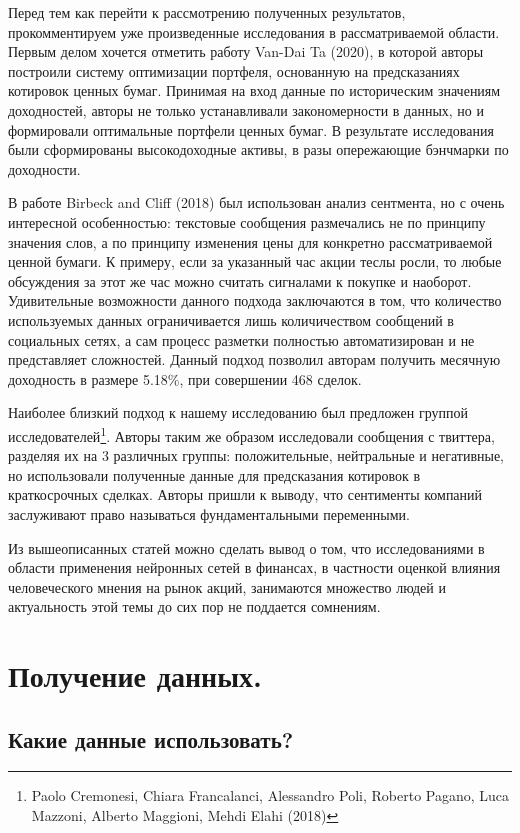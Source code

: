 \documentclass{article}
\begin{document}
Перед тем как перейти к рассмотрению полученных результатов, прокомментируем уже произведенные исследования в рассматриваемой области. Первым делом хочется отметить работу Van-Dai Ta (2020), в которой авторы построили систему оптимизации портфеля, основанную на предсказаниях котировок ценных бумаг. Принимая на вход данные по историческим значениям доходностей, авторы не только устанавливали закономерности в данных,  но и формировали оптимальные портфели ценных бумаг. В результате исследования были сформированы высокодоходные активы, в разы опережающие бэнчмарки по доходности. 
\par В работе Birbeck and Cliff (2018) был использован анализ сентмента, но с очень интересной особенностью: текстовые сообщения размечались не по принципу значения слов, а по принципу изменения цены для конкретно рассматриваемой ценной бумаги. К примеру, если за указанный час акции теслы росли, то любые обсуждения за этот же час можно считать сигналами к покупке и наоборот. Удивительные возможности данного подхода заключаются в том, что количество используемых данных ограничивается лишь количичеством сообщений в социальных сетях, а сам процесс разметки полностью автоматизирован и  не представляет сложностей. Данный подход позволил авторам получить месячную доходность в размере 5.18\%, при совершении 468 сделок.
\par Наиболее близкий подход к нашему исследованию был предложен группой исследователей\footnote{Paolo Cremonesi, Chiara Francalanci, Alessandro Poli, Roberto Pagano, Luca Mazzoni, Alberto Maggioni, Mehdi Elahi (2018)}. Авторы таким же образом исследовали сообщения с твиттера, разделяя их на 3 различных группы: положительные, нейтральные и негативные, но использовали полученные данные для предсказания котировок в краткосрочных сделках. Авторы пришли к выводу, что сентименты компаний заслуживают право называться фундаментальными переменными.
\par Из вышеописанных статей можно сделать вывод о том, что исследованиями в области применения нейронных сетей в финансах, в частности оценкой влияния человеческого мнения на рынок акций, занимаются множество людей и актуальность этой темы до сих пор не поддается сомнениям.


\section{Получение данных.}
\label{sec:data}



\subsection*{Какие данные использовать?}
\end{document}
